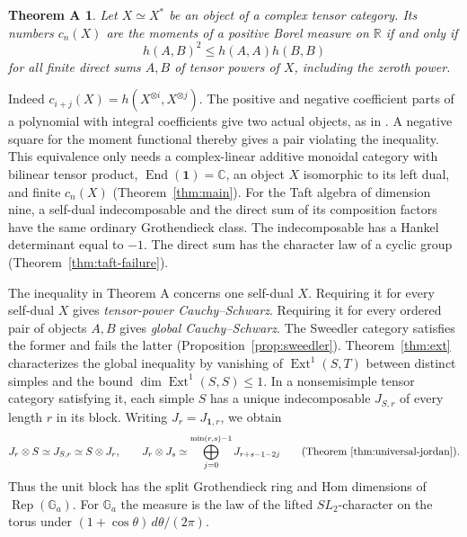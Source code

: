 \documentclass[11pt,reqno]{amsart}
\newtheorem*{theoremA}{Theorem A}
\theoremstyle{definition}
\newcommand{\End}{\operatorname{End}}
\newcommand{\Ext}{\operatorname{Ext}}
\newcommand{\one}{\mathbf 1}
\newcommand{\RR}{\mathbb R}
\newcommand{\CC}{\mathbb C}
\newcommand{\Ga}{\mathbb G_a}
\newcommand{\Rep}{\operatorname{Rep}}
\begin{document}
\begin{theoremA}
Let $X\simeq X^*$ be an object of a complex tensor category. Its numbers $c_n(X)$ are the moments of a positive Borel measure on $\RR$ if and only if
\[
             h(A,B)^2\le h(A,A)h(B,B)
\]
for all finite direct sums $A,B$ of tensor powers of $X$, including the zeroth power.
\end{theoremA}

Indeed $c_{i+j}(X)=h(X^{\otimes i},X^{\otimes j})$. The positive and negative coefficient parts of a polynomial with integral coefficients give two actual objects, as in \cite[proof of Proposition~2.1]{FFK}. A negative square for the moment functional thereby gives a pair violating the inequality. This equivalence only needs a complex-linear additive monoidal category with bilinear tensor product, $\End(\one)=\CC$, an object $X$ isomorphic to its left dual, and finite $c_n(X)$ (Theorem~\ref{thm:main}). For the Taft algebra of dimension nine, a self-dual indecomposable and the direct sum of its composition factors have the same ordinary Grothendieck class. The indecomposable has a Hankel determinant equal to $-1$. The direct sum has the character law of a cyclic group (Theorem~\ref{thm:taft-failure}).

The inequality in Theorem A concerns one self-dual $X$. Requiring it for every self-dual $X$ gives \emph{tensor-power Cauchy--Schwarz}. Requiring it for every ordered pair of objects $A,B$ gives \emph{global Cauchy--Schwarz}. The Sweedler category satisfies the former and fails the latter (Proposition~\ref{prop:sweedler}). Theorem~\ref{thm:ext} characterizes the global inequality by vanishing of $\Ext^1(S,T)$ between distinct simples and the bound $\dim\Ext^1(S,S)\le1$. In a nonsemisimple tensor category satisfying it, each simple $S$ has a unique indecomposable $J_{S,r}$ of every length $r$ in its block. Writing $J_r=J_{\one,r}$, we obtain
\[
 J_r\otimes S\simeq J_{S,r}\simeq S\otimes J_r,\qquad
 J_r\otimes J_s\simeq\bigoplus_{j=0}^{\min(r,s)-1}J_{r+s-1-2j}
 \qquad\text{(Theorem~\ref{thm:universal-jordan}).}
\]
Thus the unit block has the split Grothendieck ring and Hom dimensions of $\Rep(\Ga)$. For $\Ga$ the measure is the law of the lifted $SL_2$-character on the torus under $(1+\cos\theta)\,d\theta/(2\pi)$.
\end{document}
